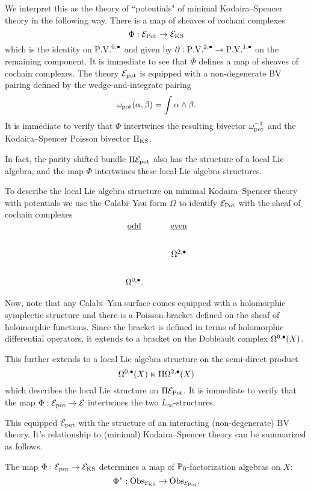 \documentclass[11pt]{amsart}
\begin{document}
We interpret this as the theory of  ``potentials"  of minimal Kodaira--Spencer theory in the following way.
There is a map of sheaves of cochani complexes
\[
\Phi : \mathcal E_{\rm Pot} \to \mathcal E_{\rm KS}
\]
which is the identity on $\PV^{0,\bu}$ and given by $\partial : \PV^{2,\bu} \to \PV^{1,\bu}$ on the remaining component.
It is immediate to see that $\Phi$ defines a map of sheaves of cochain complexes.
The theory $\mathcal E_{\rm pot}$ is equipped with a non-degenerate BV pairing defined by the wedge-and-integrate pairing
\[
\omega_{\rm pot} (\alpha, \beta) = \int \alpha \wedge \beta  .
\]
It is immediate to verify that $\Phi$ intertwines the resulting bivector $\omega_{\rm pot}^{-1}$ and the Kodaira--Spencer Poisson bivector $\Pi_{\rm KS}$.

In fact, the parity shifted bundle $\Pi \mathcal E_{\rm pot}$ also has the structure of a local Lie algebra, and the map $\Phi$ intertwines these local Lie algebra structures.

To describe the local Lie algebra structure on minimal Kodaira--Spencer theory with potentials we use the Calabi--Yau form $\Omega$ to identify $\mathcal E_{\rm Pot}$ with the sheaf of cochain complexes
\[
\begin{tikzcd}
\ul{\rm odd} & \ul{\rm even} \\
 & \Omega^{2,\bu} \\
 \Omega^{0,\bu}  .
\end{tikzcd}
\]

Now, note that any Calabi--Yau surface comes equipped with a holomorphic symplectic structure and there is a Poisson bracket defined on the sheaf of holomorphic functions.
Since the bracket is defined in terms of holomorphic differential operators, it extends to a bracket on the Dobleault complex $\Omega^{0,\bullet}(X)$.

This further extends to a local Lie algebra structure on the semi-direct product
\[
\Omega^{0,\bullet}(X) \ltimes \Pi \Omega^{2,\bullet}(X)
\]
which describes the local Lie structure on $\Pi \mathcal E_{\rm Pot}$.
It is immediate to verify that the map $\Phi : \mathcal E_{\rm pot} \to \mathcal E$ intertwines the two $L_\infty$-structures.

This equipped $\mathcal E_{\rm pot}$ with the structure of an interacting (non-degenerate) BV theory.
It's relationship to (minimal) Kodaira--Spencer theory can be summarized as follows.

\begin{prop}
The map $\Phi : \mathcal E_{\rm pot} \to \mathcal E_{\rm KS}$ determines a map of $\mathbb P_0$-factorization algebras on $X$:
\[
\Phi^* : {\rm Obs}_{\mathcal E_{\rm KS}} \to {\rm Obs}_{\mathcal E_{\rm Pot}} .
\]
\end{prop}
\end{document}

